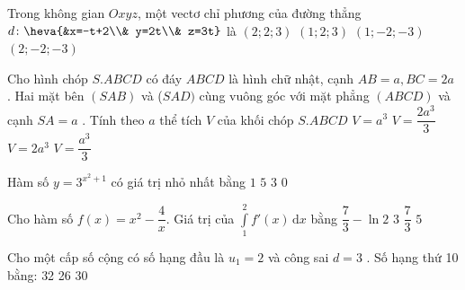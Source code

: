 \begin{ex}%
	Trong không gian $Oxyz$, một vectơ chỉ phương của đường thẳng $d\colon \heva{&x=-t+2\\&    y=2t\\&    z=3t}$ là
	\choice
	{$\left(2;2;3\right)$}
	{$\left(1;2;3\right)$}
	{\True $\left(1;-2;-3\right)$}
	{$\left(2;-2;-3\right)$}
\end{ex}
\begin{ex}%
	Cho hình chóp $S.ABCD$ có đáy $ABCD$ là hình chữ nhật, cạnh $AB=a,BC=2a$ . Hai mặt bên $\left(SAB\right)$ và ($SAD)$ cùng vuông góc với mặt phẳng $\left(ABCD\right)$ và cạnh $SA=a$ . Tính theo $a$ thể tích $V$ của khối chóp $S.ABCD$
	\choice
	{$V=a^3$}
	{\True $V=\dfrac{2a^3}{3}$}
	{$V=2a^3$}
	{$V=\dfrac{a^3}{3}$}
\end{ex}
\begin{ex}%
	Hàm số $y=3^{x^2+1}$ có giá trị nhỏ nhất bằng
	\choice
	{$1$}
	{$5$}
	{\True $3$}
	{$0$}
\end{ex}
\begin{ex}%
	Cho hàm số $f(x)=x^2-\dfrac{4}{x}$. Giá trị của $\displaystyle\int\limits_1^2 f'(x)\mathrm{\,d}x$ bằng
	\choice
	{$\dfrac{7}{3}- \ln 2$}
	{$3$}
	{$\dfrac{7}{3}$}
	{\True $5$}
\end{ex}
\begin{ex}%
	Cho một cấp số cộng có số hạng đầu là $u_1=2$ và công sai $d=3$ . Số hạng thứ 10 bằng:
	\choice
	{}
	{32}
	{26}
	{30}
\end{ex}
